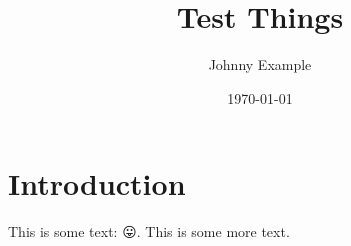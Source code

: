 \documentclass[a4paper,11pt]{scrartcl}
\title{Test Things}
\author{Johnny Example}
\date{\today}
\begin{document}
\maketitle

%
\section{Introduction}
This is some text: 😛. This is some more text.
\end{document}
